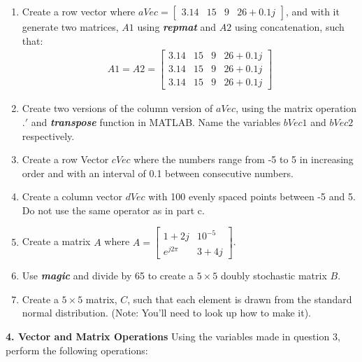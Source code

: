 \documentclass[11pt]{article}
\newenvironment{qparts}{\begin{enumerate}[{(}a{)}]}{\end{enumerate}}
\begin{document}
\begin{qparts}
    \item Create a row vector where 
    $ aVec = \begin{bmatrix}3.14&15&9&26+0.1j\end{bmatrix}$,
    and with it generate two matrices, $A1$ using \textbf{\textit{repmat}}
    and $A2$ using concatenation, such that:
    \begin{align*}
    A1 = A2 = \begin{bmatrix}3.14&15&9& 26+0.1j \\ 3.14&15&9&26+0.1j\\3.14&15&9&26+0.1j\end{bmatrix}
    \end{align*}

    \item Create two versions of the column version of $aVec$,
    using the matrix operation $.'$ and
    \textbf{\textit{transpose}} function in MATLAB.
    Name the variables $bVec1$ and $bVec2$ respectively.

    \item Create a row Vector $cVec$ where the numbers range from -5 to 5
    in increasing order and with an interval of 0.1 between consecutive numbers.

    \item Create a column vector $dVec$ with 100 evenly spaced points between -5 and 5.
    Do not use the same operator as in part c.

    \item Create a matrix $A$ where 
    $A = \begin{bmatrix} 1+2j&10^{-5}\\ e^{j2\pi}&3+4j \end{bmatrix}$.

    \item Use \textbf{\textit{magic}} and divide by 65 to create a $5 \times 5$
    doubly stochastic matrix $B$.

    \item Create a $5 \times 5$ matrix, $C$,
    such that each element is drawn from the standard normal distribution.
    (Note: You'll need to look up how to make it).

\end{qparts}

\noindent 
\newline
\textbf{4. Vector and Matrix Operations}
Using the variables made in question 3,
perform the following operations:
\end{document}
